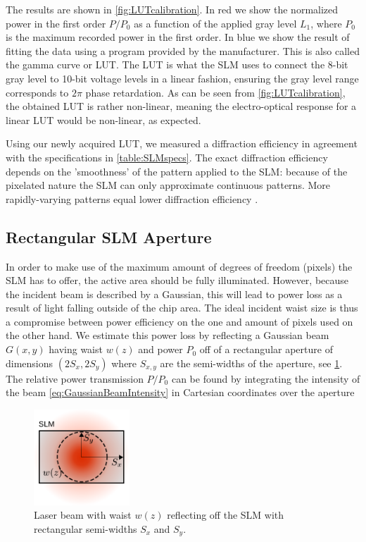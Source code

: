 The results are shown in \cref{fig:LUTcalibration}. 
In red we show the normalized power in the first order $P/P_0$ as a function of the applied gray level $L_1$, where $P_0$ is the maximum recorded power in the first order.
In blue we show the result of fitting the data using a program provided by the manufacturer.
This is also called the gamma curve or \ac{LUT}.
The LUT is what the SLM uses to connect the 8-bit gray level to 10-bit voltage levels in a linear fashion, ensuring the gray level range corresponds to $2\pi$ phase retardation.
As can be seen from \cref{fig:LUTcalibration}, the obtained LUT is rather non-linear, meaning the electro-optical response for a linear LUT would be non-linear, as expected. 

Using our newly acquired LUT, we measured a diffraction efficiency in agreement with the specifications in \cref{table:SLMspecs}. 
The exact diffraction efficiency depends on the 'smoothness' of the pattern applied to the SLM: because of the pixelated nature the SLM can only approximate continuous patterns. 
More rapidly-varying patterns equal lower diffraction efficiency \cite{Labuhn2016}.

\subsection{Rectangular SLM Aperture}\label{subsec:ApertureSize}

In order to make use of the maximum amount of degrees of freedom (pixels) the SLM has to offer, the active area should be fully illuminated.
However, because the incident beam is described by a Gaussian, this will lead to power loss as a result of light falling outside of the chip area.
The ideal incident waist size is thus a compromise between power efficiency on the one and amount of pixels used on the other hand.
We estimate this power loss by reflecting a Gaussian beam $G(x,y)$ having waist $w(z)$ and power $P_0$ off of a rectangular aperture of dimensions $(2S_x, 2S_y)$ where $S_{x,y}$ are the semi-widths of the aperture, see \cref{fig:Rectangular}.
The relative power transmission $P/P_0$ can be found by integrating the intensity of the beam \cref{eq:GaussianBeamIntensity} in Cartesian coordinates over the aperture
\begin{figure}[h]
    \centering
    \includegraphics[width=0.32\textwidth]{figures/RectangularAperture.pdf}
    \caption{Laser beam with waist $w(z)$ reflecting off the SLM with rectangular semi-widths $S_x$ and $S_y$.}
    \label{fig:Rectangular}
\end{figure}

